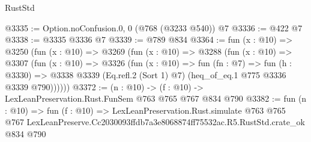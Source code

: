 \begin{lexlean}{RustStd}
\begin{coremodule}
@3335 := Option.noConfusion.{0, 0} (@768 (@3233 @540)) @7
@3336 := @422 @7
@3338 := @3335 @3336 @7
@3339 := @789 @834
@3364 := fun (x : @10) =>
  @3250
    (fun (x : @10) =>
    @3269
      (fun (x : @10) =>
      @3288
        (fun (x : @10) =>
        @3307
          (fun (x : @10) =>
          @3326
            (fun (x : @10) =>
            fun (fn : @7) =>
            fun (h : @3330) =>
            @3338 @3339 (Eq.refl.{2} (Sort 1) @7) (heq_of_eq.{1} @775 @3336 @3339 @790))))))
@3372 := (n : @10) -> (f : @10) -> LexLeanPreservation.Rust.FunSem @763 @765 @767 @834 @790
@3382 := fun (n : @10) =>
  fun (f : @10) =>
  LexLeanPreservation.Rust.simulate
    @763
    @765
    @767
    LexLeanPreserve.Cc2030093ffdb7a3e8068874ff75532ac.R5.RustStd.crate_ok
    @834
    @790
\end{coremodule}
\end{lexlean}
